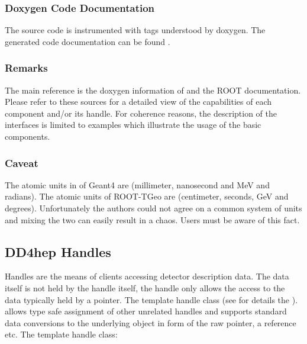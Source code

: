 \documentclass[10pt,a4paper]{article}
\begin{document}
\subsubsection{Doxygen Code Documentation}
\label{sec:dd4hep-user-manual-doxygen}
\noindent
The \DDhep source code is instrumented with tags understood by doxygen.
The generated code documentation can be found
.

\subsubsection{Remarks}
\label{sec:dd4hep-user-manual-remarks}
\noindent
The main reference is the doxygen information of \DDhep and the ROOT documentation. 
Please refer to these sources for a detailed view of the capabilities of 
each component and/or its handle.
For coherence reasons, the description of the
interfaces is limited to examples which illustrate the usage of the basic 
components. 

\subsubsection{Caveat}
\label{sec:dd4hep-user-manual-caveat}
\noindent
The atomic units in of Geant4 are (millimeter, nanosecond and MeV and radians).
The atomic units of ROOT-TGeo are (centimeter, seconds, GeV and degrees).
Unfortunately the authors could not agree on a common system of units
and mixing the two can easily result in a chaos.
Users must be aware of this fact.


\newpage
\subsection{DD4hep Handles}
\label{sec:dd4hep-user-manual-handles}
\noindent
Handles are the means of clients accessing \DDhep detector description data.
The data itself is not held by the handle itself, the handle only allows the
access to the data typically held by a pointer. The template handle class
(see for details the ).
allows type safe assignment of other unrelated handles and supports standard 
data conversions to the underlying object in form of the raw pointer, 
a reference etc. The template handle class:
\end{document}
